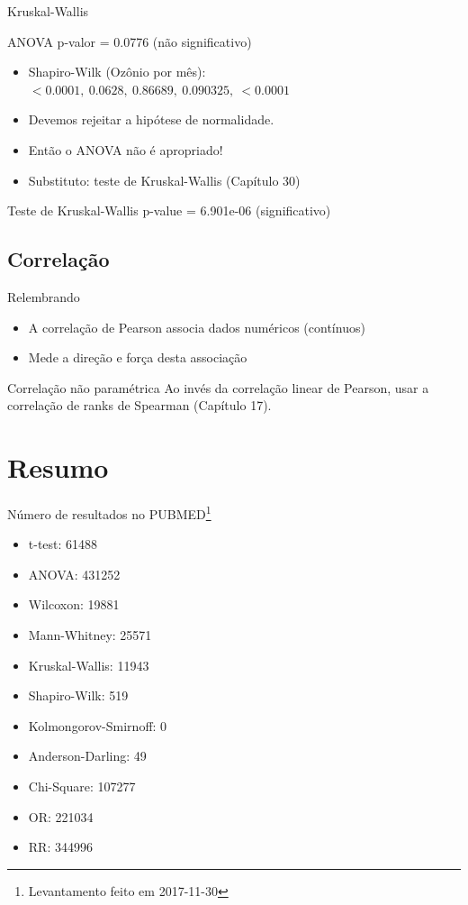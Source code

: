 \documentclass{beamer}
\begin{document}
\begin{frame}{Kruskal-Wallis}
  \begin{exampleblock}{ANOVA}
    p-valor = 0.0776 (não significativo)
  \end{exampleblock}
  \begin{itemize}
  \item Shapiro-Wilk (Ozônio por mês): $< 0.0001,\ 0.0628,\ 0.86689,\ 0.090325,\ < 0.0001$
  \item Devemos rejeitar a hipótese de normalidade.
  \item Então o ANOVA \alert{não é} apropriado!
  \item Substituto: teste de Kruskal-Wallis (Capítulo 30)
  \end{itemize}
  \begin{exampleblock}{Teste de Kruskal-Wallis}
    p-value = \alert{6.901e-06} (significativo)
  \end{exampleblock}
\end{frame}

\subsection{Correlação}

\begin{frame}{Relembrando}
  \begin{itemize}
  \item A correlação de Pearson associa dados numéricos (contínuos)
  \item Mede a direção e força desta associação
  \end{itemize}
  \begin{block}{Correlação não paramétrica}
    Ao invés da correlação linear de Pearson, usar a correlação de ranks de Spearman (Capítulo 17).
  \end{block}
\end{frame}

\section{Resumo}

\begin{frame}{Número de resultados no PUBMED\footnote{Levantamento feito em 2017-11-30}}
  \begin{itemize}
  \item t-test: 61488
  \item ANOVA: 431252
  \item Wilcoxon: 19881
  \item Mann-Whitney: 25571
  \item Kruskal-Wallis: 11943
  \item Shapiro-Wilk: 519
  \item Kolmongorov-Smirnoff: 0
  \item Anderson-Darling: 49
  \item Chi-Square: 107277
  \item OR: 221034
  \item RR: 344996
  \end{itemize}
\end{frame}
\end{document}
